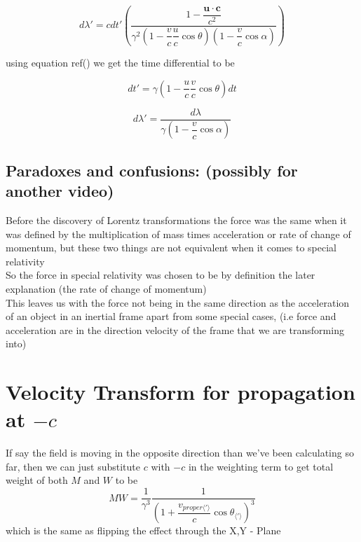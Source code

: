 \begin{equation}
	d\lambda' = c dt' \left( \dfrac{  1 - \dfrac{\mathbf{u}\cdot\mathbf{c}}{c^2}  }
	{ \gamma^2 \left(1-\dfrac{v}{c}\dfrac{u}{c}\cos\theta \right) \left(1-\dfrac{v}{c}\cos\alpha \right)} \right)
\end{equation}

using equation ref() we get the time differential to be

\begin{equation}
	dt' = \gamma \left( 1 - \dfrac{u}{c}\dfrac{v}{c}\cos\theta \right) dt
\end{equation}

\begin{equation}
	d\lambda' = \dfrac{ d\lambda }{ \gamma \left(1-\dfrac{v}{c}\cos\alpha \right)}
\end{equation}

\section{Paradoxes and confusions: (possibly for another video)}

Before the discovery of Lorentz transformations the force was the same when it was defined by the multiplication of mass times acceleration or rate of change of momentum, but these two things are not equivalent when it comes to special relativity\\
So the force in special relativity was chosen to be by definition the later explanation (the rate of change of momentum)\\
This leaves us with the force not being in the same direction as the acceleration of an object in an inertial frame apart from some special cases, (i.e force and acceleration are in the direction velocity of the frame that we are transforming into)

\chapter{Velocity Transform for propagation at \texorpdfstring{$-c$}{TEXT}}

If say the field is moving in the opposite direction than we've been calculating so far, then we can just substitute $c$ with $-c$ in the weighting term to get total weight of both $M$ and $W$ to be
\begin{equation}%
    M W = \dfrac{1}{\gamma^3}\dfrac{1}{\left( 1 + \dfrac{v_{proper\langle ' \rangle}}{c}\cos{\theta_{\langle ' \rangle}} \right)^3}
\end{equation}%
which is the same as flipping the effect through the X,Y - Plane

